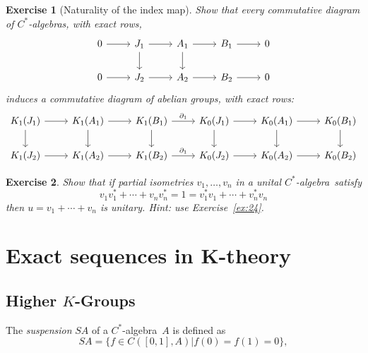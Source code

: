 \documentclass{book}
\newtheorem{exercise}{Exercise}[section]
\def\cstar{\(C^*\)-algebra}
\def\cstars{\(C^*\)-algebras}
\begin{document}
\begin{exercise}[Naturality of the index map]\label{ex:7317}
  Show that every commutative diagram of \cstars, with exact rows,
  \[
    \begin{tikzcd}
    0\arrow[r]&J_1 \arrow[r]\arrow[d]&A_1\arrow[r]\arrow[d]&B_1\arrow[r]&0\\
    0\arrow[r]&J_2 \arrow[r]&A_2\arrow[r]&B_2\arrow[r]&0
    \end{tikzcd}
  \]
  induces a commutative diagram of abelian groups, with exact rows:
  \[
    \begin{tikzcd}
    K_1(J_1) \arrow[r]\arrow[d]&K_1(A_1)\arrow[r]\arrow[d]&K_1(B_1)\arrow[r,"\partial_1"]\arrow[d]&K_0(J_1) \arrow[r]\arrow[d]&K_0(A_1)\arrow[r]\arrow[d]&K_0(B_1)\arrow[d]\\
    K_1(J_2) \arrow[r]&K_1(A_2)\arrow[r]&K_1(B_2)\arrow[r,"\partial_1"]&K_0(J_2) \arrow[r]&K_0(A_2)\arrow[r]&K_0(B_2)
    \end{tikzcd}
  \]
\end{exercise}
\begin{exercise}
  Show that if partial isometries \(v_1,\ldots,v_n\) in a unital \cstar\ satisfy
  \[
    v_1v_1^*+\cdots+v_n v_n^*=1=v_1^*v_1+\cdots+v_n^*v_n
  \]
  then \(u=v_1+\cdots+v_n\) is unitary. Hint: use Exercise~\ref{ex:24}.
\end{exercise}
  
\chapter{Exact sequences in K-theory}
\section{Higher \texorpdfstring{\(K\)}{K}-Groups}
The \textit{suspension} \(S A\) of a \cstar\ \(A\) is defined as
\[
  S A=\{f\in C([0,1],A)| f(0)=f(1)=0\},
\]
\end{document}
